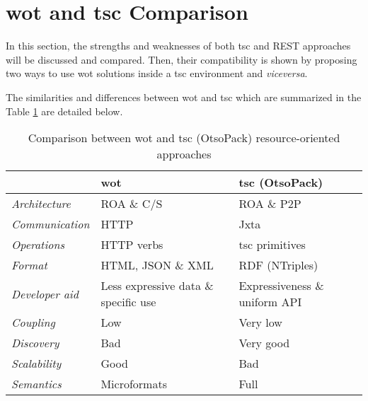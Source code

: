 %
%





\section{\acs{wot} and \acs{tsc} Comparison}
\label{sec:wot_tsc_comparison}


In this section, the strengths and weaknesses of both \ac{tsc} and REST approaches will be discussed and compared.
Then, their compatibility is shown by proposing two ways to use \ac{wot} solutions inside a \ac{tsc} environment and \textit{viceversa}.

The similarities and differences between \ac{wot} and \ac{tsc} which are summarized in the Table \ref{tab:comparison} are detailed below.

\begin{table}[ht!]
\centering
\caption {Comparison between \ac{wot} and \ac{tsc} (OtsoPack) resource-oriented approaches}
\begin{tabular}{|l|p{}|p{}|}
\hline
& \ac{wot} & \ac{tsc} (OtsoPack) \\
\hline
\textit{Architecture} & ROA \& C/S & ROA \& P2P \\
\textit{Communication} & HTTP & Jxta \\
\textit{Operations} & HTTP verbs & \ac{tsc} primitives \\
\textit{Format} & HTML, JSON \& XML & RDF (NTriples) \\ %
\textit{Developer aid} & Less expressive data \& specific use & Expressiveness \& uniform API \\
\textit{Coupling} & Low & Very low \\ %
\textit{Discovery} & Bad & Very good \\
\textit{Scalability} & Good & Bad \\
\textit{Semantics} & Microformats & Full \\
\hline
\end{tabular}
\label{tab:comparison}
\end{table}

